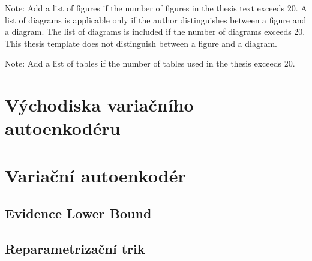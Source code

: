 \documentclass[11pt,a4paper]{report}
\let\openright=\clearpage
\begin{document}


\setcounter{tocdepth}{2}
\tableofcontents

\openright
\listoffigures
Note: Add a list of figures if the number of figures in the thesis text exceeds 20. A list of diagrams is applicable only if the author distinguishes between a figure and a diagram. The list of diagrams is included if the number of diagrams exceeds 20. This thesis template does not distinguish between a figure and a diagram.

\clearpage
\listoftables
Note: Add a list of tables if the number of tables used in the thesis exceeds 20. 



\pagestyle{fancyx}
{%
\pagestyle{plain}

}

\chapter{Východiska variačního autoenkodéru}








\chapter{Variační autoenkodér}
\label{chap:vae}
\section{Evidence Lower Bound}
\section{Reparametrizační trik}
\end{document}
